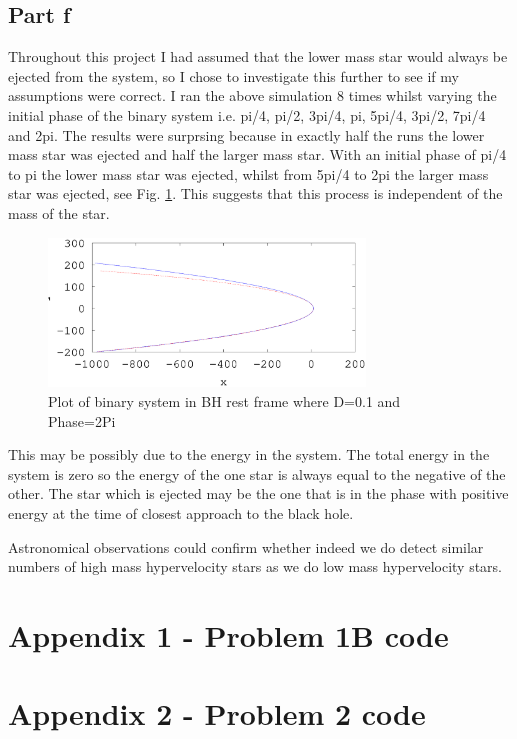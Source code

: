 \documentclass[a4paper,12pt]{article}
\begin{document}
\subsection{Part f}
Throughout this project I had assumed that the lower mass star would always be ejected from the system, so I chose to investigate this further to see if my assumptions were correct.
I ran the above simulation 8 times whilst varying the initial phase of the binary system i.e. pi/4, pi/2, 3pi/4, pi, 5pi/4, 3pi/2, 7pi/4 and 2pi.
The results were surprsing because in exactly half the runs the lower mass star was ejected and half the larger mass star. With an initial phase of pi/4 to pi the lower mass star was ejected, whilst from 5pi/4 to 2pi the larger mass star was ejected, see Fig. \ref{fig:problem3_7}. This suggests that this process is independent of the mass of the star.
\begin{figure}[H]
\centering
\includegraphics[width=0.75\textwidth]{./problem3/problem3_7}
\caption{Plot of binary system in BH rest frame where D=0.1 and Phase=2Pi}
\label{fig:problem3_7}
\end{figure}
This may be possibly due to the energy in the system. The total energy in the system is zero so the energy of the one star is always equal to the negative of the other. The star which is ejected may be the one that is in the phase with positive energy at the time of closest approach to the black hole. 

Astronomical observations could confirm whether indeed we do detect similar numbers of high mass hypervelocity stars as we do low mass hypervelocity stars.
\newpage
\section{Appendix 1 - Problem 1B code}

\newpage
\section{Appendix 2 - Problem 2 code}






\newpage
\end{document}

